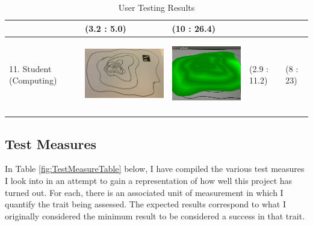 \documentclass[11pt]{article}
\begin{document}
\begin{landscape}
\begin{longtable}{p{}| p{}| p{} | p{} |p{}}
							& (3.2 : 5.0)
							& (10 : 26.4)\\
\hline
11. Student (Computing) & \begin{center}\includegraphics[scale=0.5]{pics/usertesting/11.png}\end{center} 
							& \begin{center}\includegraphics[scale=0.5]{pics/usertesting/11render.png}\end{center} 
							& (2.9 : 11.2)
							& (8 : 23)\\
\hline
\caption{User Testing Results}
\label{usertestingtable}
\end{longtable}
\end{landscape}
\newpage


\subsection{Test Measures}
In Table \ref{fig:TestMeasureTable} below, I have compiled the various 
test measures I look into in an attempt to gain a representation of how 
well this project has turned out. For each, there is an associated 
unit of measurement in which I quantify the trait being assessed. 
The expected results correspond to what I originally considered the 
minimum result to be considered a success in that trait.
\end{document}
